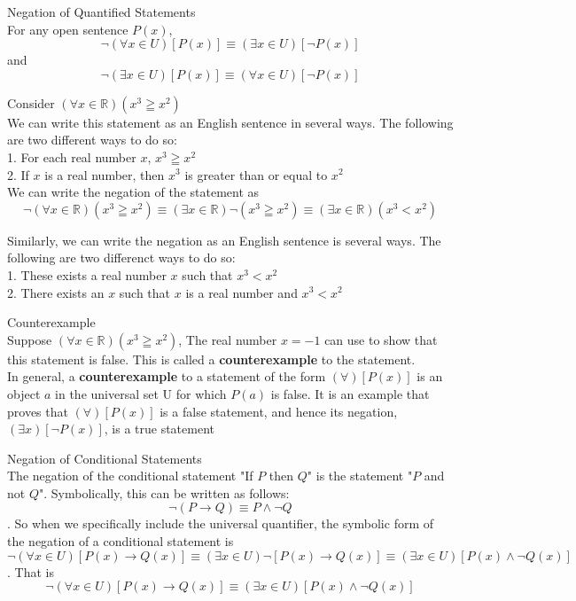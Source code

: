 \begin{definition}
Negation of Quantified Statements \\

For any open sentence $P(x)$, \[ \neg(\forall x \in U)[P(x)] \equiv (\exists x \in U)[\neg P(x)]\]  and \[ \neg(\exists x \in U)[P(x)] \equiv (\forall x \in U)[\neg P(x)]\]
\end{definition}


\begin{example}
Consider $(\forall x \in \mathbb{R})(x^3 \geqq x^2)$ \\

We can write this statement  as an English sentence in several ways. The following are two different ways to do so: \\
1. For each real number $x$, $x^3 \geqq x^2$ \\
2. If $x$ is a real number, then $x^3$ is greater than or equal to $x^2$ \\
We can write the negation of the statement as \[ \neg (\forall x \in \mathbb{R})(x^3 \geqq x^2) \equiv (\exists x \in \mathbb{R}) \neg (x^3 \geqq x^2) \equiv (\exists x \in \mathbb{R})(x^3 < x^2) \]

Similarly, we can write the negation as an English sentence is several ways. The following are two differenct ways to do so: \\
1. These exists a real number $x$ such that $x^3 < x^2$ \\
2. There exists an $x$ such that $x$ is a real number and $x^3 < x^2$
\end{example}


\begin{definition}
Counterexample \\

Suppose $(\forall x \in \mathbb{R})(x^3 \geqq x^2)$, The real number $x = -1$ can use to show that this statement is false. This is called a {\bf counterexample} to the statement. \\
In general, a {\bf counterexample} to a statement of the form $(\forall)[P(x)]$ is an object $a$ in the universal set U for which $P(a)$ is false. It is an example that proves that $(\forall)[P(x)]$ is a false statement, and hence its negation, $(\exists x)[\neg P(x)]$, is a true statement
\end{definition}

\begin{definition}
Negation of Conditional Statements \\

The negation of the conditional statement "If $P$ then $Q$" is the statement "$P$ and not $Q$". Symbolically, this can be written as follows: \[ \neg (P \to Q) \equiv P \wedge \neg Q \]. So when we specifically include the universal quantifier, the symbolic form of the negation of a conditional statement is \[ \neg(\forall x \in U)[P(x) \to Q(x)] \equiv (\exists x \in U)\neg[P(x) \to Q(x)] \equiv (\exists x \in U)[P(x) \wedge \neg Q(x)] \]. That is \[ \neg(\forall x \in U)[P(x) \to Q(x)] \equiv (\exists x \in U)[P(x) \wedge \neg Q(x)] \]
\end{definition}


